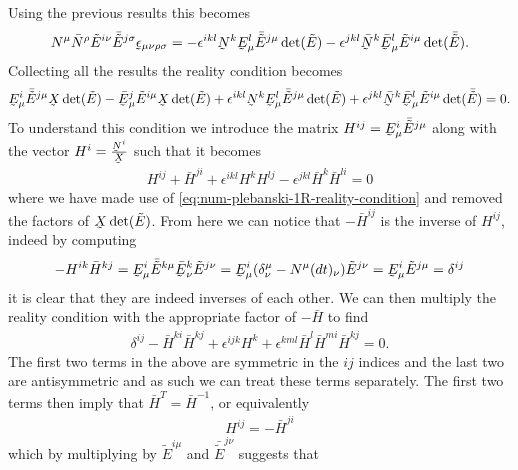 \documentclass[10pt]{report}
\newcommand{\utilde}[1]{\underaccent{\tilde}{#1}}
\theoremstyle{definition}
\newcommand{\uteps}[0]{\utilde{\epsilon}}
\newcommand{\tE}[0]{\tilde{E}}
\newcommand{\utE}[0]{\utilde{E}}
\begin{document}
    Using the previous results this becomes 
    \begin{align}
        N^\mu \bar{N}^\rho \tE^{i\nu} \bar{\tE}^{j\sigma} \uteps_{\mu\nu\rho\sigma} = -\epsilon^{ikl} \utilde{N}^k \utE^l_\mu  \bar{\tE}^{j\mu} \det(\tE) - \epsilon^{jkl}  \bar{\utilde{N}}^k \bar{\utE}^l_\mu \tE^{i\mu} \det(\bar{\tE}).
    \end{align}
    Collecting all the results the reality condition becomes 
    \begin{align}
        \utE^i_\mu \bar{\tE}^{j\mu} \utilde{X} \det(\tE) - \bar{\utE}^j_\mu \tE^{i\mu} \utilde{X} \det(\tE) + \epsilon^{ikl} \utilde{N}^k \utE^l_\mu  \bar{\tE}^{j\mu} \det(\tE) + \epsilon^{jkl}  \bar{\utilde{N}}^k \bar{\utE}^l_\mu \tE^{i\mu} \det(\bar{\tE}) = 0.
    \end{align}
    To understand this condition we introduce the matrix $H^{ij} = \utE^i_\mu \bar{\tE}^{j\mu}$ along with the vector $H^i = \frac{\utilde{N}^i}{\utilde{X}}$ such that it becomes 
    \begin{align}
        H^{ij} + \bar{H}^{ji} + \epsilon^{ikl} H^k H^{lj} - \epsilon^{jkl} \bar{H}^k \bar{H}^{li} = 0
    \end{align}
    where we have made use of \cref{eq:num-plebanski-1R-reality-condition} and removed the factors of $\utilde{X} \det(\tE)$. From here we can notice that $-\bar{H}^{ij}$ is the inverse of $H^{ij}$, indeed by computing 
    \begin{align}
        - H^{ik} \bar{H}^{kj} = \utE^i_\mu \bar{\tE}^{k\mu} \bar{\utE}^k_\nu \tE^{j\nu} = \utE^i_\mu (\delta^\mu_\nu - N^\mu (dt)_\nu) \tE^{j\nu} = \utE^i_\mu \tE^{j\mu} = \delta^{ij}
    \end{align}
    it is clear that they are indeed inverses of each other. We can then multiply the reality condition with the appropriate factor of $-\bar{H}$ to find 
    \begin{align}
        \delta^{ij} - \bar{H}^{ki} \bar{H}^{kj} + \epsilon^{ijk} H^k + \epsilon^{kml} \bar{H}^l \bar{H}^{mi} \bar{H}^{kj} = 0.
    \end{align}
    The first two terms in the above are symmetric in the $ij$ indices and the last two are antisymmetric and as such we can treat these terms separately. The first two terms then imply that $\bar{H}^T = \bar{H}^{-1}$, or equivalently 
    \begin{align}
        H^{ij} = -\bar{H}^{ji}
    \end{align}
    which by multiplying by $\tE^{i\mu}$ and $\bar{\tE}^{j\nu}$ suggests that 
\end{document}
